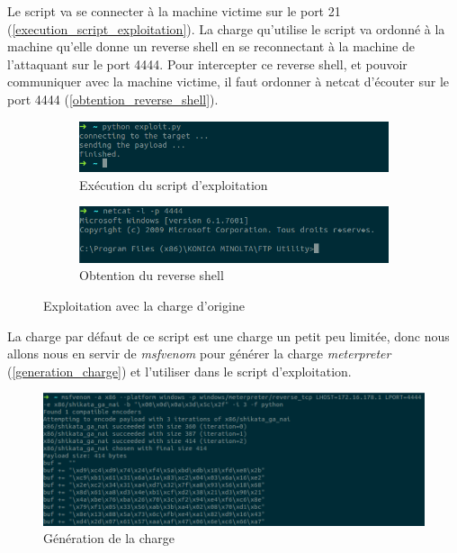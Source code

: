     Le script va se connecter à la machine victime sur le port 21 (\autoref{execution_script_exploitation}). 
    La charge qu'utilise le 
    script va ordonné à la machine qu'elle donne un reverse shell en se reconnectant à la machine de l'attaquant 
    sur le port 4444. Pour intercepter ce reverse shell, et pouvoir communiquer avec
    la machine victime, il faut ordonner à netcat d'écouter sur le port 4444 (\autoref{obtention_reverse_shell}).

    \begin{figure}[h!]
        \centering
        \begin{subfigure}{0.9\textwidth}
            \centering
            \includegraphics[width=\textwidth]{images/exploit_python.png}
            \caption{Exécution du script d'exploitation}
            \label{execution_script_exploitation}
        \end{subfigure}
        \hfill
        \begin{subfigure}{0.9\textwidth}
            \centering
            \includegraphics[width=\textwidth]{images/reverse_shell.png}
            \caption{Obtention du reverse shell}
            \label{obtention_reverse_shell}
        \end{subfigure}
        \hfill
        \caption{Exploitation avec la charge d'origine}
        \label{exploitation_avec_charge_origine}
    \end{figure}

    La charge par défaut de ce script est une charge un petit peu limitée, donc nous allons nous en servir 
    de \emph{msfvenom} pour générer la charge \emph{meterpreter} (\autoref{generation_charge}) et l'utiliser 
    dans le script d'exploitation.
    \begin{figure}[h]
        \centering
        \includegraphics[width=\linewidth]{images/msfvenom.png}
        \caption{Génération de la charge}
        \label{generation_charge}
    \end{figure}


